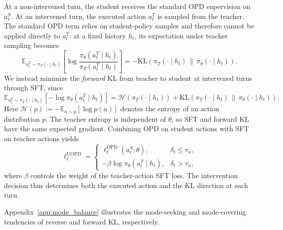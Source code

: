 At a non-intervened turn, the student receives the standard OPD supervision on $a_t^S$. At an intervened turn, the executed action $a_t^T$ is sampled from the teacher. The standard OPD term relies on student-policy samples and therefore cannot be applied directly to $a_t^T$: at a fixed history $h_t$, its expectation under teacher sampling becomes
\begin{equation}
\mathbb E_{a_t^T\sim\pi_T(\cdot\mid h_t)}\!\left[
\log\frac{\pi_\theta(a_t^T\mid h_t)}{\pi_T(a_t^T\mid h_t)}
\right]
=-\mathrm{KL}\!\left(\pi_T(\cdot\mid h_t)\,\middle\|\,\pi_\theta(\cdot\mid h_t)\right).
\label{eq:teacher_sampled_log_ratio}
\end{equation}
We instead minimize the \emph{forward} KL from teacher to student at intervened turns through SFT, since
\begin{equation*}
\mathbb E_{a_t^T\sim\pi_T(\cdot\mid h_t)}[-\log\pi_\theta(a_t^T\mid h_t)]
=\mathcal{H}\!\left(\pi_T(\cdot\mid h_t)\right)
+\mathrm{KL}\!\left(\pi_T(\cdot\mid h_t)\,\middle\|\,\pi_\theta(\cdot\mid h_t)\right).
\end{equation*}
  Here $\mathcal H(p):=-\mathbb E_{a\sim p}[\log p(a)]$ denotes the entropy
  of an action distribution $p$. The teacher entropy is independent of $\theta$, so SFT
  and forward KL have the same expected gradient. Combining OPD on student
  actions with SFT on teacher actions yields
\begin{equation}
\ell_t^{\mathrm{UOPD}}=
\begin{cases}
\ell_t^{\mathrm{OPD}}(a_t^S;\theta),
& \delta_t\le\tau_n,\\[3pt]
-\beta\log\pi_\theta(a_t^T\mid h_t),
& \delta_t>\tau_n,
\end{cases}
\label{eq:said_step}
\end{equation}
  where $\beta$ controls the weight of the teacher-action SFT loss.
  The intervention decision thus determines both the executed action
  and the KL direction at each turn.

  Appendix~\ref{app:mode_balance} illustrates the
  mode-seeking and mode-covering tendencies of reverse and forward KL,
  respectively.



